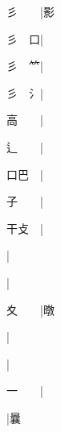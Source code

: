 \begin{multicols}{2}
{{\cjk{}彡{\cnsym{}　}{\cnsym{}　}}|{\cjk{}影}\par
{\cjk{}彡{\cnsym{}　}口}|{}\par
{\cjk{}彡{\cnsym{}　}{\cnxb{}𥫗}}|{}\par
{\cjk{}彡{\cnsym{}　}{\cnxHanaA{}氵}}|{}\par
{\cjk{}高{\cnsym{}　}{\cnsym{}　}}|{}\par
{\cjk{}辶{\cnsym{}　}{\cnsym{}　}}|{}\par
{\cjk{}口巴{\cnsym{}　}}|{}\par
{\cjk{}子{\cnsym{}　}{\cnsym{}　}}|{}\par
{\cjk{}干攴{\cnsym{}　}}|{}\par
{\cjk{}{\cnsym{}　}{\cnsym{}　}{\cnsym{}　}}|{}\par
{}|{}\par
{\cjk{}夊{\cnsym{}　}{\cnsym{}　}}|{\cjk{}暾}\par
{}|{}\par
{}|{}\par
{\cjk{}一{\cnsym{}　}{\cnsym{}　}}|{}\par
{}|{\cjk{}曩}\par
}
\end{multicols}
